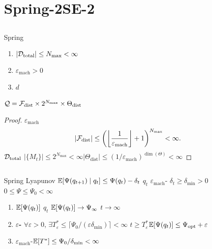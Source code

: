 \section{ Spring-2SE-2}\label{sec:spring2}

\subsection{}

Spring 

\begin{enumerate}[nosep]
    \item \textbf{}  $|\mathcal{D}_{\text{total}}| \leq N_{\max} < \infty$
    \item \textbf{}  $\varepsilon_{\text{mach}} > 0$ 
    \item \textbf{}  $d$ 
\end{enumerate}

\begin{proposition}[]\label{prop:finite-config}
 $\mathcal{Q} = \mathcal{F}_{\text{dist}} \times 2^{N_{\max}} \times \Theta_{\text{dist}}$ 
\end{proposition}

\begin{proof}
 $\varepsilon_{\text{mach}}$ 
\begin{equation}
    |\mathcal{F}_{\text{dist}}| \leq \left(\left\lfloor \frac{1}{\varepsilon_{\text{mach}}} \right\rfloor + 1\right)^{N_{\max}} < \infty.
\end{equation}
 $\mathcal{D}_{\text{total}}$  $|\{M_t\}| \leq 2^{N_{\max}} < \infty$$|\Theta_{\text{dist}}| \leq (1/\varepsilon_{\text{mach}})^{\dim(\Theta)} < \infty$
\end{proof}

\subsection{}

\begin{theorem}[Spring-2]\label{thm:spring2}
 Spring  Lyapunov  $\mathbb{E}[\Psi(q_{t+1}) \mid q_t] \leq \Psi(q_t) - \delta_t$ $q_t$  $\varepsilon_{\text{mach}}$- $\delta_t \geq \delta_{\min} > 0$ $0 \leq \Psi \leq \Psi_0 < \infty$
\begin{enumerate}[label=(\alph*), nosep]
    \item \textbf{}$\mathbb{E}[\Psi(q_t)]$  $q_t$  $\mathbb{E}[\Psi(q_t)] \to \Psi_\infty$  $t \to \infty$
    \item \textbf{$\varepsilon$-} $\forall \varepsilon > 0$, $\exists T_\varepsilon^* \leq \lceil \Psi_0 / (\varepsilon \delta_{\min}) \rceil < \infty$  $t \geq T_\varepsilon^*$$\mathbb{E}[\Psi(q_t)] \leq \Psi_{\text{opt}} + \varepsilon$
    \item \textbf{}  $\varepsilon_{\text{mach}}$-$\mathbb{E}[T^*] \leq \Psi_0 / \delta_{\min} < \infty$
\end{enumerate}
\end{theorem}

